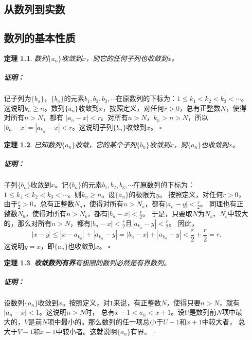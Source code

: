 \documentclass[12pt,UTF8]{ctexbook}
\newtheorem{tm}{定理}[section]
\newenvironment{proof2}{\paragraph{\textbf{证明：}}}{\hfill$\square$}
\begin{document}
\begin{appendix}

\chapter{从数列到实数}
\section{数列的基本性质}

\begin{tm}\label{tm:a-0-10}
    数列$\{a_n\}$收敛到$x$，则它的任何子列也收敛到$x$。
\end{tm}
\begin{proof2}
    记子列为$\{b_n\}$，$\{b_n\}$的元素$b_1,b_2,b_3,\cdots$在原数列的下标为：$1\leqslant k_1<k_2<k_3<\cdots$。
    这说明$k_n \geqslant n$。数列$\{a_n\}$收敛到$x$，按照定义，对任何$r>0$，总有正整数$N$，使得对所有$n>N$，都有
    $ |a_n - x| < r$。对所有$n>N$，$k_n>n>N$，所以$|b_n - x| = |a_{k_n} - x| < r$。这说明子列$\{b_n\}$收敛到$x$。
\end{proof2}

\begin{tm}\label{tm:a-0-20}
    已知数列$\{a_n\}$收敛，它的某个子列$\{b_n\}$收敛到$x$，则$\{a_n\}$也收敛到$x$。
\end{tm}
\begin{proof2}
    子列$\{b_n\}$收敛到$x$。记$\{b_n\}$的元素$b_1,b_2,b_3,\cdots$在原数列的下标为：
    $1\leqslant k_1<k_2<k_3<\cdots$。则$k_n \geqslant n$。设$\{a_n\}$的极限为$y$。
    按照定义，对任何$r>0$，由于$\frac{r}{2} > 0$，总有正整数$N_a$，使得对所有$n>N_a$，都有$ |a_n - y| < \frac{r}{2}$。
    同理也有正整数$N_b$，使得对所有$n>N_b$，都有$ |b_n - x| < \frac{r}{2}$。
    于是，只要取$N$为$N_a$、$N_b$中较大的，那么对所有$n>N$，都有$|b_n - x| < \frac{r}{2}$且$ |a_{k_n} - y| < \frac{r}{2}$。
    因此，
    $$|x - y| \leqslant |x - a_{k_n}| + |a_{k_n} - y| = |b_n - x| + |a_{k_n} - y| < \frac{r}{2} + \frac{r}{2} = r. $$
    这说明$y = x$，即$\{a_n\}$也收敛到$x$。
\end{proof2}

\begin{tm}{\textbf{收敛数列有界}}\label{tm:a-0-30}
    有极限的数列必然是有界数列。
\end{tm}
\begin{proof2}
    设数列$\{a_n\}$收敛到$x$。按照定义，对$1$来说，有正整数$N$，使得只要$n>N$，就有$|a_n - x| < 1$。这说明$n>N$时，
    总有$x - 1 < a_n < x + 1$。设$U$是数列前$N$项中最大的，$V$是前$N$项中最小的。那么数列的任一项总小于$U+1$和$x+1$中较大者，
    总大于$V-1$和$x-1$中较小者。这就说明$\{a_n\}$有界。
\end{proof2}


\end{appendix}
\end{document}
